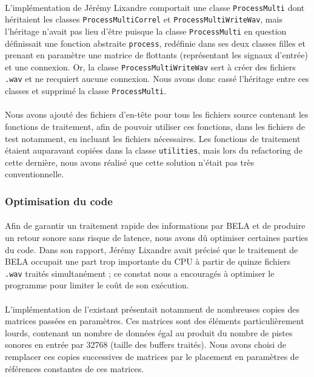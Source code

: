 \paragraph{}
L'implémentation de Jérémy Lixandre comportait une classe \verb!ProcessMulti! dont héritaient les classes \verb!ProcessMultiCorrel! et \verb!ProcessMultiWriteWav!, mais l'héritage n'avait pas lieu d'être puisque la classe \verb!ProcessMulti! en question définissait une fonction abstraite \verb!process!, redéfinie dans ses deux classes filles et prenant en paramètre une matrice de flottants (représentant les signaux d'entrée) et une connexion. Or, la classe \verb!ProcessMultiWriteWav! sert à créer des fichiers \verb!.wav! et ne recquiert aucune connexion. Nous avons donc cassé l'héritage entre ces classes et supprimé la classe \verb!ProcessMulti!.

\paragraph{}
Nous avons ajouté des fichiers d'en-tête pour tous les fichiers source
contenant les fonctions de traitement, afin de pouvoir utiliser ces
fonctions, dans les fichiers de test notamment, en incluant les fichiers
nécessaires. Les fonctions de traitement étaient auparavant copiées
dans la classe \verb!utilities!, mais lors du refactoring de cette
dernière, nous avons réalisé que cette solution n'était pas très
conventionnelle.


\subsubsection{Optimisation du code}
\paragraph{}
Afin de garantir un traitement rapide des informations par BELA et de
produire un retour sonore sans risque de latence, nous avons dû
optimiser certaines parties du code. Dans son rapport, Jérémy Lixandre
avait précisé que le traitement de BELA occupait une part trop
importante du CPU à partir de quinze fichiers \verb!.wav! traités
simultanément ; ce constat nous a encouragés à optimiser le programme
pour limiter le coût de son exécution.
\paragraph{}
L'implémentation de l'existant présentait notamment de nombreuses
copies des matrices passées en paramètres. Ces matrices sont des
éléments particulièrement lourds, contenant un nombre de données égal
au produit du nombre de pistes sonores en entrée par 32768 (taille des
buffers traités). Nous avons choisi de remplacer ces copies
successives de matrices par le placement en paramètres de références
constantes de ces matrices.

